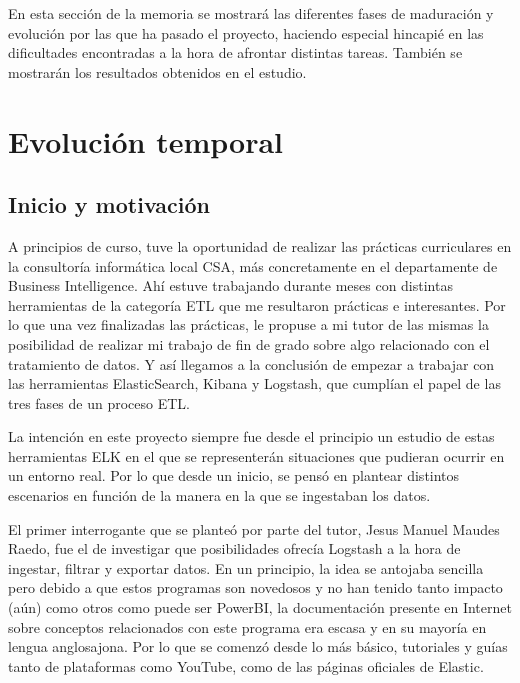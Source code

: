 
En esta sección de la memoria se mostrará las diferentes fases de maduración y evolución por las que ha pasado el proyecto, haciendo especial hincapié en las dificultades encontradas a la hora de afrontar distintas tareas. También se mostrarán los resultados obtenidos en el estudio.

\section{Evolución temporal}

\subsection{Inicio y motivación}

A principios de curso, tuve la oportunidad de realizar las prácticas curriculares en la consultoría informática local CSA, más concretamente en el departamente de Business Intelligence. Ahí estuve trabajando durante meses con distintas herramientas de la categoría ETL que me resultaron prácticas e interesantes. Por lo que una vez finalizadas las prácticas, le propuse a mi tutor de las mismas la posibilidad de realizar mi trabajo de fin de grado sobre algo relacionado con el tratamiento de datos. Y así llegamos a la conclusión de empezar a trabajar con las herramientas ElasticSearch, Kibana y Logstash, que cumplían el papel de las tres fases de un proceso ETL.

La intención en este proyecto siempre fue desde el principio un estudio de estas herramientas ELK en el que se representerán situaciones que pudieran ocurrir en un entorno real. Por lo que desde un inicio, se pensó en plantear distintos escenarios en función de la manera en la que se ingestaban los datos.

El primer interrogante que se planteó por parte del tutor, Jesus Manuel Maudes Raedo, fue el de investigar que posibilidades ofrecía Logstash a la hora de ingestar, filtrar y exportar datos. En un principio, la idea se antojaba sencilla pero debido a que estos programas son novedosos y no han tenido tanto impacto (aún) como otros como puede ser PowerBI, la documentación presente en Internet sobre conceptos relacionados con este programa era escasa y en su mayoría en lengua anglosajona. Por lo que se comenzó desde lo más básico, tutoriales y guías tanto de plataformas como YouTube, como de las páginas oficiales de Elastic. 

